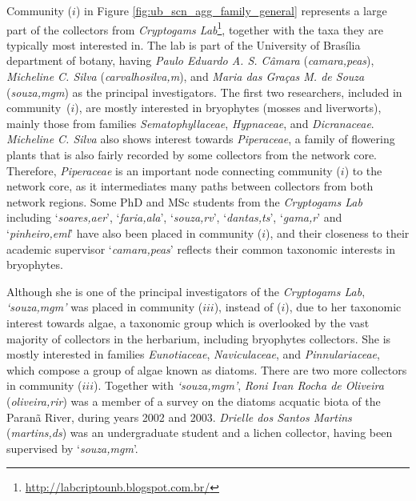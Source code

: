 Community ($i$) in Figure \ref{fig:ub_scn_agg_family_general} represents a large part of the collectors from \textit{Cryptogams Lab}\footnote{\url{http://labcriptounb.blogspot.com.br/}}, together with the taxa they are typically most interested in. 
The lab is part of the University of Brasília department of botany, having \textit{Paulo Eduardo A. S. Câmara} (\textit{camara,peas}), \textit{Micheline C. Silva} (\textit{carvalhosilva,m}), and \textit{Maria das Graças M. de Souza} (\textit{souza,mgm}) as the principal investigators. 
%
The first two researchers, included in community~($i$), are mostly interested in bryophytes (mosses and liverworts), mainly those from families \textit{Sematophyllaceae}, \textit{Hypnaceae}, and \textit{Dicranaceae}.
\textit{Micheline C. Silva} also shows interest towards \textit{Piperaceae}, a family of flowering plants that is also fairly recorded by some collectors from the network core. 
Therefore, \textit{Piperaceae} is an important node connecting community ($i$) to the network core, as it intermediates many paths between collectors from both network regions.
%
Some PhD and MSc students from the \textit{Cryptogams Lab} including `\textit{soares,aer}', `\textit{faria,ala}', `\textit{souza,rv}', `\textit{dantas,ts}', `\textit{gama,r}' and `\textit{pinheiro,eml}' have also been placed in community ($i$), and their closeness to their academic supervisor `\textit{camara,peas}' reflects their common taxonomic interests in bryophytes.

Although she is one of the principal investigators of the \textit{Cryptogams Lab}, \textit{`souza,mgm'} was placed in community ($iii$), instead of ($i$), due to her taxonomic interest towards algae, a taxonomic group which is overlooked by the vast majority of collectors in the herbarium, including bryophytes collectors. 
She is mostly interested in families \textit{Eunotiaceae}, \textit{Naviculaceae}, and \textit{Pinnulariaceae}, which compose a group of algae known as diatoms.
There are two more collectors in community ($iii$).
Together with \textit{`souza,mgm'}, \textit{Roni Ivan Rocha de Oliveira} (\textit{oliveira,rir}) was a member of a survey on the diatoms acquatic biota of the Paranã River, during years 2002 and 2003.
\textit{Drielle dos Santos Martins} (\textit{martins,ds}) was an undergraduate student and a lichen collector, having been supervised by `\textit{souza,mgm}'.

